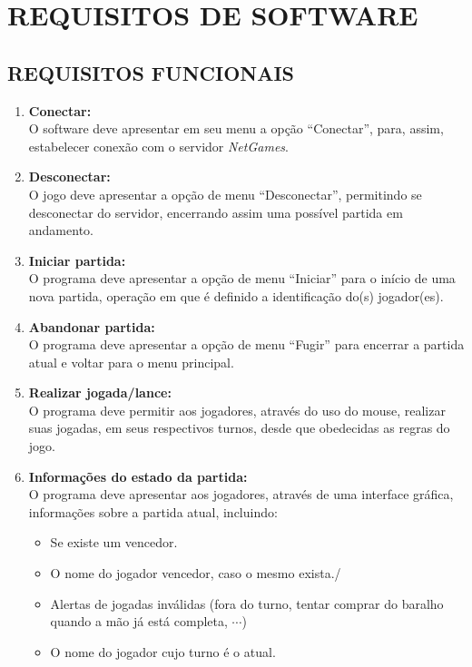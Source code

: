 \documentclass[12pt,a4paper,brazil,abntex2]{article}
\begin{document}
\section{\normalsize REQUISITOS DE SOFTWARE}
	\subsection{\normalsize REQUISITOS FUNCIONAIS}
		
		\begin{enumerate}
			\item {\bf Conectar:}\\
				O software deve apresentar em seu menu a opção ``Conectar'', para, assim, estabelecer conexão com o servidor \textit{NetGames}.

			\item {\bf Desconectar:}\\
				O jogo deve apresentar a opção de menu ``Desconectar'', permitindo se desconectar do servidor, encerrando assim uma possível partida em andamento.
			
			\item {\bf Iniciar partida:}\\
				O programa deve apresentar a opção de menu ``Iniciar'' para o início de uma nova partida, operação em que é definido a identificação do(s) jogador(es).
			
			\item {\bf Abandonar partida:}\\
				O programa deve apresentar a opção de menu ``Fugir'' para encerrar a partida atual e voltar para o menu principal.

			\item {\bf Realizar jogada/lance:}\\
				O programa deve permitir aos jogadores, através do uso do mouse, realizar suas jogadas, em seus respectivos turnos, desde que obedecidas as regras do jogo.
			
			\item {\bf Informações do estado da partida:}\\
				O programa deve apresentar aos jogadores, através de uma interface gráfica, informações sobre a partida atual, incluindo:
					\begin{itemize}
						\item Se existe um vencedor.
						\item O nome do jogador vencedor, caso o mesmo exista./
						\item Alertas de jogadas inválidas (fora do turno, tentar comprar do baralho quando a mão já está completa, $\cdots$)
						\item O nome do jogador cujo turno é o atual.
					\end{itemize}
			
		\end{enumerate}
		
\end{document}
